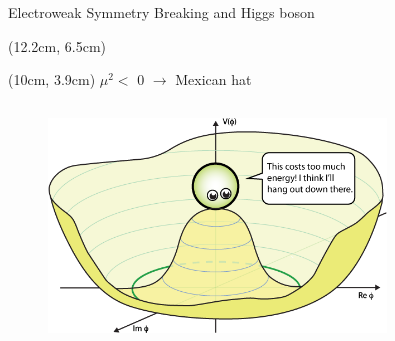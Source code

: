 \begin{frame}{Electroweak Symmetry Breaking and Higgs boson}
\begin{textblock*}{5cm}(12.2cm, 6.5cm) %
\end{textblock*}
\begin{textblock*}{5cm}(10cm, 3.9cm) %
$\mu^2 <$ 0 $\to$ Mexican hat 
\end{textblock*}
\begin{columns}
\begin{figure}
    \centering
    \includegraphics[width=0.8\textwidth]{Part1/Img/Higgs-Potential-lookdown.png}
\end{figure}
\end{columns}
\end{frame}

